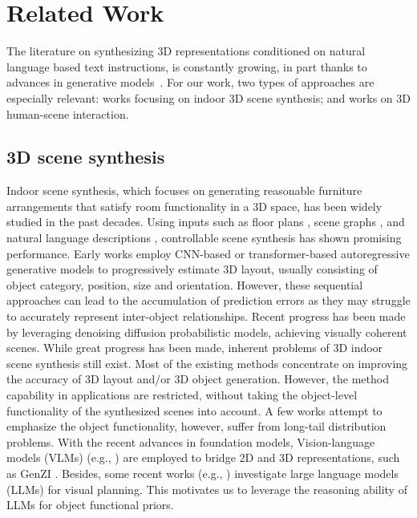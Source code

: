 \section{Related Work}
\label{sec:relat}

The literature on synthesizing 3D representations conditioned on natural language based text instructions, is constantly growing, in part thanks to advances in generative models~\cite{poole2022dreamfusion}. For our work, two types of approaches are especially relevant: works focusing on indoor 3D scene synthesis; and works on 3D human-scene interaction. 

\subsection{3D scene synthesis} 
Indoor scene synthesis, which focuses on generating reasonable furniture arrangements that satisfy room functionality in a 3D space, has been widely studied in the past decades. Using inputs such as floor plans \cite{paschalidou2021atiss, feng2024layoutgpt}, scene graphs \cite{zhai2024echoscene, wei2024planner3d,GraphDreamer}, and natural language descriptions \cite{tang2024diffuscene, lin2024instructscene}, controllable scene synthesis has shown promising performance. Early works \cite{ritchie2019fast, wang2021sceneformer, paschalidou2021atiss} employ CNN-based or transformer-based autoregressive generative models to progressively estimate 3D layout, usually consisting of object category, position, size and orientation. However, these sequential approaches can lead to the accumulation of prediction errors as they may struggle to accurately represent inter-object relationships. Recent progress \cite{tang2024diffuscene, lin2024instructscene} has been made by leveraging denoising diffusion probabilistic models, achieving visually coherent scenes. While great progress has been made, inherent problems of 3D indoor scene synthesis still exist. Most of the existing methods concentrate on improving the accuracy of 3D layout and/or 3D object generation. However, the method capability in applications are restricted, without taking the object-level functionality of the synthesized scenes into account. A few works \cite{zhang2021fast, min2024funcscene} attempt to emphasize the object functionality, however, suffer from long-tail distribution problems. With the recent advances in foundation models, Vision-language models (VLMs) (e.g., \cite{rombach2022high}) are employed to bridge 2D and 3D representations, such as GenZI \cite{li2024genzi}. Besides, some recent works (e.g., \cite{feng2024layoutgpt, ocal2024sceneteller, zhou2024gala3d}) investigate large language models (LLMs) for visual planning. This motivates us to leverage the reasoning ability of LLMs for object functional priors.  

